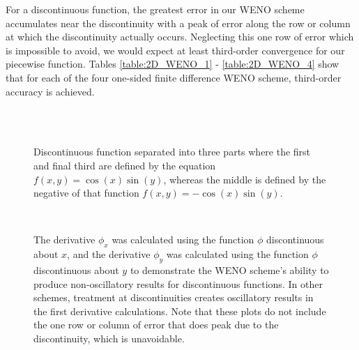 \documentclass[oneside,12pt,final]{/Applications/TeX/packages/ucthesis-CA2012}
\begin{document}
\begin{mainmatter}
For a discontinuous function, the greatest error in our WENO scheme accumulates near the discontinuity with a peak of error along the row or column at which the discontinuity actually occurs. Neglecting this one row of error which is impossible to avoid, we would expect at least third-order convergence for our piecewise function. Tables \ref{table:2D_WENO_1} - \ref{table:2D_WENO_4} show that for each of the four one-sided finite difference WENO scheme, third-order accuracy is achieved.

\begin{figure} [!h]
\centering
{} \quad
{} \\
 \quad
{}\\
    \caption[Discontinuous Function Used to Test Accuracy of WENO Schemes]{Discontinuous function separated into three parts where the first and final third are defined by the equation $f(x,y)=\cos(x)\sin(y)$, whereas the middle is defined by the negative of that function $f(x,y)=-\cos(x)\sin(y)$. }
  \label{fig:discontinuous_WENO}
\end{figure}

\begin{figure} [!h]
\centering
{} \quad
{} \\
 \quad
{}
    \caption[Non-Oscillatory Results for WENO One-Sided Derivatives]{The derivative $\phi_x$ was calculated using the function $\phi$ discontinuous about $x$, and the derivative $\phi_y$ was calculated using the function $\phi$ discontinuous about $y$ to demonstrate the WENO scheme's ability to produce non-oscillatory results for discontinuous functions. In other schemes, treatment at discontinuities creates oscillatory results in the first derivative calculations. Note that these plots do not include the one row or column of error that does peak due to the discontinuity, which is unavoidable.}
  \label{fig:discontinuous_derivatives}
\end{figure}


\end{mainmatter}
\end{document}
